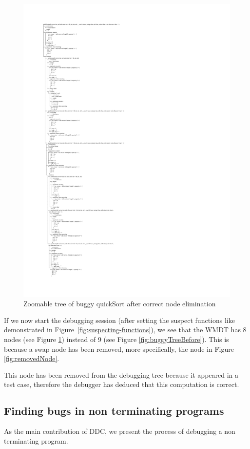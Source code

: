 \begin{figure}
\centering
    \caption{Zoomable tree of buggy quickSort after correct node elimination}
    \label{fig:treeAfterRemoval}
\includegraphics[width=\textwidth,height=\textheight,keepaspectratio]{Imagenes/Vectorial/buggySwapRemoved.pdf}
\end{figure}
If we now start the debugging session (after setting the suspect functions like demonstrated in Figure~\ref{fig:suspecting-functions}), we see that the WMDT has 8 nodes (see Figure \ref{fig:treeAfterRemoval}) instead of 9 (see Figure \ref{fig:buggyTreeBefore}). This is because a swap node has been removed, more specifically, the node in Figure \ref{fig:removedNode}.

This node has been removed from the debugging tree because it appeared in a test case, therefore the debugger has deduced that this computation is correct.
\subsection{Finding bugs in non terminating programs}
As the main contribution of DDC, we present the process of debugging a non terminating program.

